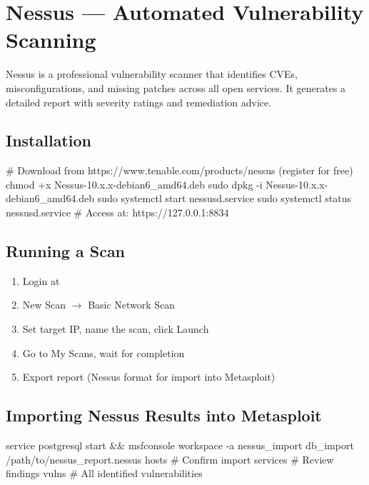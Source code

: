 \section{Nessus --- Automated Vulnerability Scanning}
\label{sec:nessus}

Nessus is a professional vulnerability scanner that identifies CVEs, misconfigurations,
and missing patches across all open services. It generates a detailed report with
severity ratings and remediation advice.

\subsection{Installation}

\begin{termbox}
# Download from https://www.tenable.com/products/nessus (register for free)
chmod +x Nessus-10.x.x-debian6_amd64.deb
sudo dpkg -i Nessus-10.x.x-debian6_amd64.deb
sudo systemctl start nessusd.service
sudo systemctl status nessusd.service
# Access at: https://127.0.0.1:8834
\end{termbox}

\subsection{Running a Scan}

\begin{enumerate}
  \item Login at 
  \item New Scan $\rightarrow$ Basic Network Scan
  \item Set target IP, name the scan, click Launch
  \item Go to My Scans, wait for completion
  \item Export report (Nessus format for import into Metasploit)
\end{enumerate}

\subsection{Importing Nessus Results into Metasploit}

\begin{termbox}
service postgresql start && msfconsole
workspace -a nessus_import
db_import /path/to/nessus_report.nessus
hosts         # Confirm import
services      # Review findings
vulns         # All identified vulnerabilities
\end{termbox}

